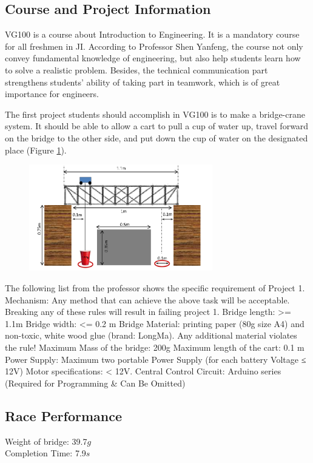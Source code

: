\subsection{Course and Project Information}


VG100 is a course about Introduction to Engineering. It is a mandatory course
for all freshmen in JI. According to Professor Shen Yanfeng, the course not only
convey fundamental knowledge of engineering, but also help students learn how to
solve a realistic problem. Besides, the technical communication part strengthens
students’ ability of taking part in teamwork, which is of great importance for
engineers.  

The first project students should accomplish in VG100 is to make a bridge-crane
system. It should be able to allow a cart to pull a cup of water up, travel
forward on the bridge to the other side, and put down the cup of water on the
designated place (Figure \ref{fig:structureOfP1}).  

\begin{figure}[H]
\centering
\includegraphics[width=8cm]{figure/structureOfP1}
\caption{\label{fig:structureOfP1}}
\end{figure}

The following list from the professor shows the specific requirement of Project 1.
Mechanism: Any method that can achieve the above task will be acceptable.
Breaking any of these rules will result in failing project 1.  
Bridge length:  >= 1.1m 
Bridge width:  <= 0.2 m 
Bridge Material: printing paper (80g size A4) and non-toxic, white wood glue
(brand: LongMa). Any additional material violates the rule!  
Maximum Mass of the bridge: 200g 
Maximum length of the cart: 0.1 m 
Power Supply: Maximum two portable Power Supply (for each battery Voltage ≤ 12V) 
Motor specifications: < 12V.  
Central Control Circuit: Arduino series (Required for Programming \& Can Be Omitted)

\subsection{Race Performance}
\noindent
Weight of bridge: 39.7$g$ \\
Completion Time: 7.9$s$